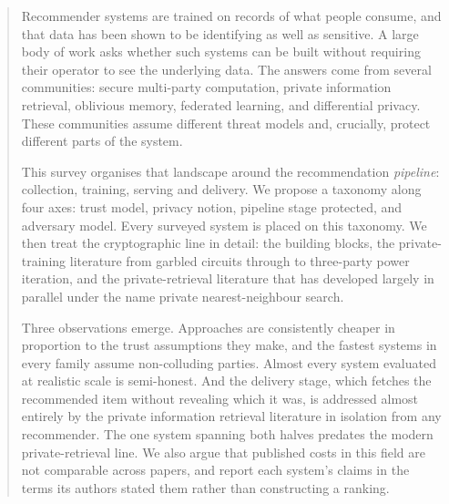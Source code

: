 \begin{abstract}
\noindent
Recommender systems are trained on records of what people consume, and that data has been shown to
be identifying as well as sensitive. A large body of work asks whether such systems can be built
without requiring their operator to see the underlying data. The answers come from several
communities: secure multi-party computation, private information retrieval, oblivious memory,
federated learning, and differential privacy. These communities assume different threat models and,
crucially, protect different parts of the system.

This survey organises that landscape around the recommendation \emph{pipeline}: collection,
training, serving and delivery. We propose a taxonomy along four axes: trust model, privacy
notion, pipeline stage protected, and adversary model. Every surveyed system is placed on this
taxonomy. We then treat the cryptographic line in detail: the building blocks, the private-training
literature from garbled circuits through to three-party power iteration, and the private-retrieval
literature that has developed largely in parallel under the name private nearest-neighbour search.

Three observations emerge. Approaches are consistently cheaper in proportion to the trust
assumptions they make, and the fastest systems in every family assume non-colluding parties.
Almost every system evaluated at realistic scale is semi-honest. And the delivery stage, which
fetches the recommended item without revealing which it was, is addressed almost entirely by the
private information retrieval literature in isolation from any recommender. The one system spanning
both halves predates the modern private-retrieval line. We also argue that published costs in this
field are not comparable across papers, and report each system's claims in the terms its authors
stated them rather than constructing a ranking.
\end{abstract}
